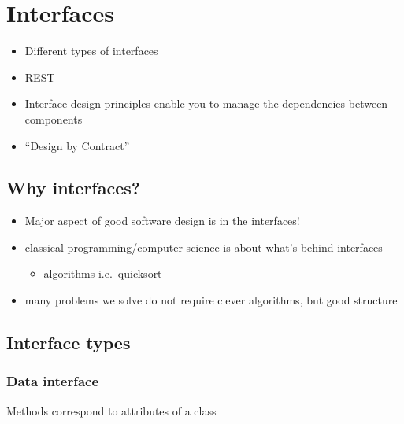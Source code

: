 \hypertarget{interfaces}{%
\section{Interfaces}\label{interfaces}}

\begin{tcolorbox}[colback=blue!5!white,colframe=blue!75!black]
\begin{itemize}
\tightlist
\item
  Different types of interfaces
\item
  REST
\item
  Interface design principles enable you to manage the dependencies
  between components
\item
  ``Design by Contract''
\end{itemize}
\end{tcolorbox}

\hypertarget{why-interfaces}{%
\subsection{Why interfaces?}\label{why-interfaces}}

\begin{itemize}
\tightlist
\item
  Major aspect of good software design is in the interfaces!
\item
  classical programming/computer science is about what's behind
  interfaces

  \begin{itemize}
  \tightlist
  \item
    algorithms i.e.~quicksort
  \end{itemize}
\item
  many problems we solve do not require clever algorithms, but good
  structure
\end{itemize}

\hypertarget{interface-types}{%
\subsection{Interface types}\label{interface-types}}

\hypertarget{data-interface}{%
\subsubsection{Data interface}\label{data-interface}}

Methods correspond to attributes of a class

